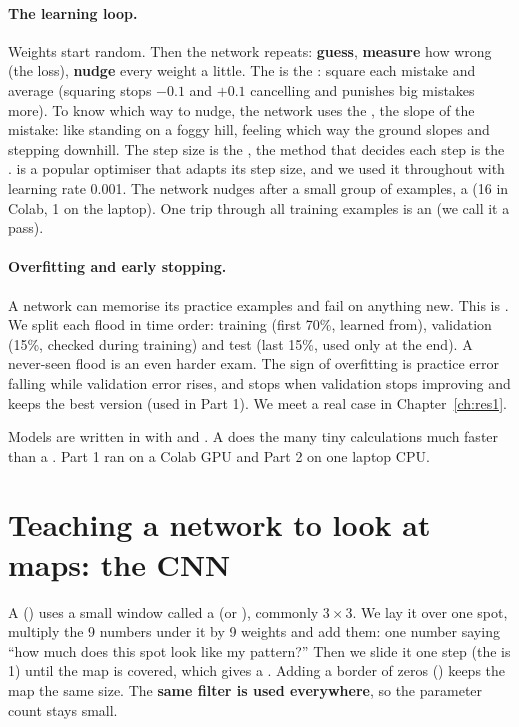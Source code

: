 \paragraph{The learning loop.} Weights start random. Then the network repeats: \textbf{guess}, \textbf{measure} how wrong (the loss), \textbf{nudge} every weight a little. The  is the : square each mistake and average (squaring stops $-0.1$ and $+0.1$ cancelling and punishes big mistakes more). To know which way to nudge, the network uses the , the slope of the mistake: like standing on a foggy hill, feeling which way the ground slopes and stepping downhill. The step size is the , the method that decides each step is the .  is a popular optimiser that adapts its step size, and we used it throughout with learning rate 0.001. The network nudges after a small group of examples, a  (16 in Colab, 1 on the laptop). One trip through all training examples is an  (we call it a pass).

\paragraph{Overfitting and early stopping.} A network can memorise its practice examples and fail on anything new. This is . We split each flood in time order: training (first 70\%, learned from), validation (15\%, checked during training) and test (last 15\%, used only at the end). A never-seen flood is an even harder exam. The sign of overfitting is practice error falling while validation error rises, and  stops when validation stops improving and keeps the best version (used in Part 1). We meet a real case in Chapter~\ref{ch:res1}.

Models are written in  with  and . A  does the many tiny calculations much faster than a . Part 1 ran on a Colab GPU and Part 2 on one laptop CPU.

\section{Teaching a network to look at maps: the CNN}\label{ch:cnn}

A  () uses a small window called a  (or ), commonly $3\times3$. We lay it over one spot, multiply the 9 numbers under it by 9 weights and add them: one number saying ``how much does this spot look like my pattern?'' Then we slide it one step (the  is 1) until the map is covered, which gives a . Adding a border of zeros () keeps the map the same size. The \textbf{same filter is used everywhere}, so the parameter count stays small.

